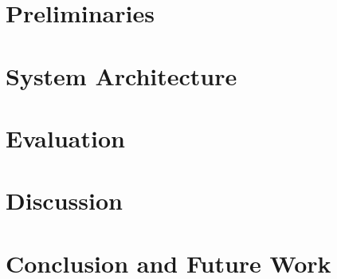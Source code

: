 \documentclass[a4paper,10pt,twoside]{report}
\begin{document}
\chapter{Preliminaries}\label{chapter:preliminaries}


\clearemptydoublepage

\chapter{System Architecture}\label{chapter:systemArchitecture}


\clearemptydoublepage

\chapter{Evaluation}\label{chapter:evaluation}


\clearemptydoublepage

\chapter{Discussion}\label{chapter:discussion}


\clearemptydoublepage

\chapter{Conclusion and Future Work}\label{chapter:conclusions}


\clearemptydoublepage

%



\clearemptydoublepage

\appendix
{}


\end{document}
